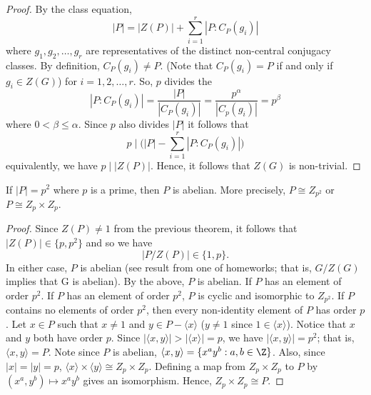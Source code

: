 \begin{proof}
    By the class equation, 
    \[ | P  |  = | Z(P)    |  + \sum_{ i =1  }^{ r  } | P : {C}_{P}({g}_{i}) |  \]
    where \( {g}_{1}, {g}_{2}, \dots, {g}_{r} \) are representatives of the distinct non-central conjugacy classes. By definition, \( {C}_{P}({g}_{i}) \neq P  \). (Note that \( {C}_{P}({g}_{i}) = P  \) if and only if \( {g}_{i} \in Z(G) \)) for \( i = 1,2, \dots, r  \). So, \( p  \) divides the \[ | P : {C}_{P}({g}_{i}) | = \frac{ | P |  }{  | {C}_{P}({g}_{i}) |  } = \frac{ p^{\alpha} }{  | {C}_{p}({g}_{i}) |  } = p^{\beta}    \]
    where \( 0  < \beta \leq \alpha \). Since \( p  \) also divides \( |  P  |   \) it follows that 
    \[  p \mid \Big(  | P  |  - \sum_{ i=1  }^{ r } | P : {C}_{P}({g}_{i}) |  \Big) \]
    equivalently, we have \( p \mid | Z(P) |  \). Hence, it follows that \( Z(G)  \) is non-trivial.
\end{proof}

\begin{corollary}
    If \( | P  | = p^{2} \) where \( p  \) is a prime, then \( P  \) is abelian. More precisely, \( P \cong {Z}_{p^{2}}  \) or \( P \cong {Z}_{p} \times {Z}_{p} \). 
\end{corollary}
\begin{proof}
Since \( Z(P) \neq 1  \) from the previous theorem, it follows that \( | Z(P) |  \in \{  p, p^{2} \}  \) and so we have 
\[  |  P / Z(P) | \in \{  1, p  \}.   \]
In either case, \( P   \) is abelian (see result from one of homeworks; that is, \( G / Z(G) \) implies that  G  is abelian). By the above, \( P  \) is abelian. If \( P  \) has an element of order \( p^{2} \). If \( P  \) has an element of order \( p^{2} \), \( P  \) is cyclic and isomorphic to \( {Z}_{p^{2}} \). If \( P \) contains no elements of order \( p^{2} \), then every non-identity element of \( P \) has order \( p  \). Let \( x \in P  \) such that \( x \neq 1  \) and \( y \in P - \langle  x  \rangle \) (\( y \neq 1  \) since \( 1 \in \langle  x \rangle \)). Notice that \( x  \) and \( y  \) both have order \( p  \). Since \( | \langle x , y \rangle |  > | \langle x   \rangle | = p  \), we have \( | \langle x , y \rangle |  = p^{2} \); that is, \( \langle x , y \rangle = P  \). Note since \( P  \) is abelian, \( \langle x  ,  y  \rangle = \{  x^{a} y^{b } : a,b \in \Z \}  \). Also, since \( | x  |  = | y  |  = p  \), \( \langle x  \rangle \times \langle y  \rangle  \cong {Z}_{p} \times {Z}_{p} \). Defining a map from \( {Z}_{p} \times {Z}_{p} \) to \( P  \) by \( (x^{a}, y^{b}) \mapsto x^{a} y^{b} \) gives an isomorphism. Hence, \( {Z}_{p} \times {Z}_{p} \cong P  \).
\end{proof}




